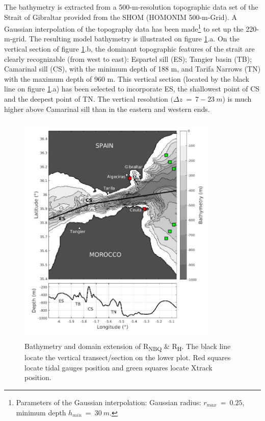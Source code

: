 \vspace{\baselineskip}
The bathymetry is extracted from a 500-m-resolution topographic data set of the Strait of Gibraltar provided from the SHOM (HOMONIM 500-m-Grid). A Gaussian interpolation of the topography data has been made\footnote{Parameters of the Gaussian interpolation: Gaussian radius: $r_{max}\ =\ 0.25$, minimum depth $h_{min}\ =\ 30\ m$.} to set up the 220-m-grid. The resulting model bathymetry is illustrated on figure \ref{Fig1_Lucie}.a. On the vertical section of figure \ref{Fig1_Lucie}.b, the dominant topographic features of the strait are clearly recognizable (from west to east): Espartel sill (ES); Tangier basin (TB); Camarinal sill (CS), with the minimum depth of 188 m, and Tarifa Narrows (TN) with the maximum depth of 960 m. This vertical section (located by the black line on figure \ref{Fig1_Lucie}.a) has been selected to incorporate ES, the shallowest point of CS and the deepest point of TN. The vertical resolution $(\Delta z\ =\ 7-23\ m$) is much higher above Camarinal sill than in the eastern and western ends. \par

\vspace{\baselineskip}


\begin{figure}[!h]
	\begin{Center}
		\includegraphics[width=3.77in,height=4.44in]{./media/image1.jpg}
	\end{Center}


\caption { Bathymetry and domain extension of R\textsubscript{NBQ} $\&$  R\textsubscript{H}. The black line locate the vertical transect/section on the lower plot. Red squares locate tidal gauges position and green squares locate Xtrack position.}
 \label{Fig1_Lucie}
\end{figure}

